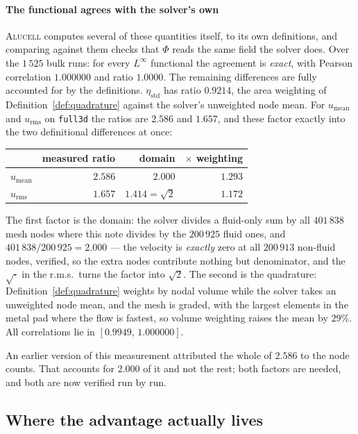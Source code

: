 \documentclass[11pt,a4paper]{article}
\theoremstyle{plain}
\theoremstyle{definition}
\theoremstyle{remark}
\begin{document}
\paragraph{The functional agrees with the solver's own}
\textsc{Alucell} computes several of these quantities itself, to its own
definitions, and comparing against them checks that $\Phi$ reads the same field
the solver does. Over the $1\,525$ bulk runs: for every
$L^\infty$ functional the agreement is \emph{exact}, with Pearson correlation
$1.000000$ and ratio $1.0000$. The remaining differences are fully accounted for
by the definitions. $\eta_{\mathrm{std}}$ has ratio $0.9214$, the area weighting
of Definition~\ref{def:quadrature} against the solver's unweighted node mean.
For $u_{\mathrm{mean}}$ and $u_{\mathrm{rms}}$ on \texttt{full3d} the ratios are
$2.586$ and $1.657$, and these factor exactly into the two definitional
differences at once:
\begin{center}
\small
\begin{tabular}{@{}lrrr@{}}
\toprule
& measured ratio & domain & $\times$ weighting \\
\midrule
$u_{\mathrm{mean}}$ & $2.586$ & $2.000$   & $1.293$ \\
$u_{\mathrm{rms}}$  & $1.657$ & $1.414 = \sqrt{2}$ & $1.172$ \\
\bottomrule
\end{tabular}
\end{center}
The first factor is the domain: the solver divides a fluid-only sum by all
$401\,838$ mesh nodes where this note divides by the $200\,925$ fluid ones, and
$401\,838/200\,925 = 2.000$ --- the velocity is \emph{exactly} zero at all
$200\,913$ non-fluid nodes, verified, so the extra nodes contribute nothing but
denominator, and the $\sqrt{\cdot}$ in the r.m.s.\ turns the factor into
$\sqrt2$. The second is the quadrature: Definition~\ref{def:quadrature} weights
by nodal volume while the solver takes an unweighted node mean, and the mesh is
graded, with the largest elements in the metal pad where the flow is fastest, so
volume weighting raises the mean by $29\%$. All correlations lie in
$[0.9949,\,1.000000]$.

An earlier version of this measurement attributed the whole of $2.586$ to the
node counts. That accounts for $2.000$ of it and not the rest; both factors are
needed, and both are now verified run by run.

\subsection{Where the advantage actually lives}
\label{sec:per-regime}
\end{document}
